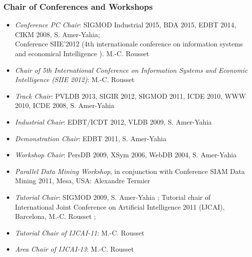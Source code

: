 \subsubsection*{Chair  of Conferences and Workshops}

\begin{itemize}
\setlength{\itemindent}{-0.5cm}
\setlength{\itemsep}{-0.1cm}

\item \emph{Conference PC Chair}: SIGMOD Industrial 2015, BDA 2015, EDBT 2014, CIKM 2008,  S. Amer-Yahia;  \\ 
Conference SIIE'2012 (4th internationale conference  on information systems and economical Intelligence ). M.-C. Rousset 

\item \emph{ Chair of 5th International Conference on Information Systems and Economic Intelligence (SIIE 2012)}: M.-C. Rousset


\item \emph{Track Chair}: PVLDB 2013, SIGIR 2012, SIGMOD 2011, ICDE 2010, WWW 2010, ICDE 2008, S. Amer-Yahia

\item \emph{Industrial Chair}: EDBT/ICDT 2012, VLDB 2009,  S. Amer-Yahia

\item \emph{Demonstration Chair}: EDBT 2011, S. Amer-Yahia

\item \emph{Workshop Chair}: PersDB 2009, XSym 2006, WebDB 2004, S. Amer-Yahia

\item \emph{Parallel Data Mining Workshop}, in conjunction with Conference SIAM Data Mining 2011,  Mesa, USA: Alexandre Termier  

\item \emph{Tutorial Chair}: SIGMOD 2009, S. Amer-Yahia ; Tutorial chair of International Joint Conference on Artificial Intelligence 2011 (IJCAI),  Barcelona,  M.-C. Rousset ; 

\item \emph{Tutorial Chair of IJCAI-11}: M.-C. Rousset

\item \emph{Area Chair of IJCAI-13}: M.-C. Rousset
 
\end{itemize}
